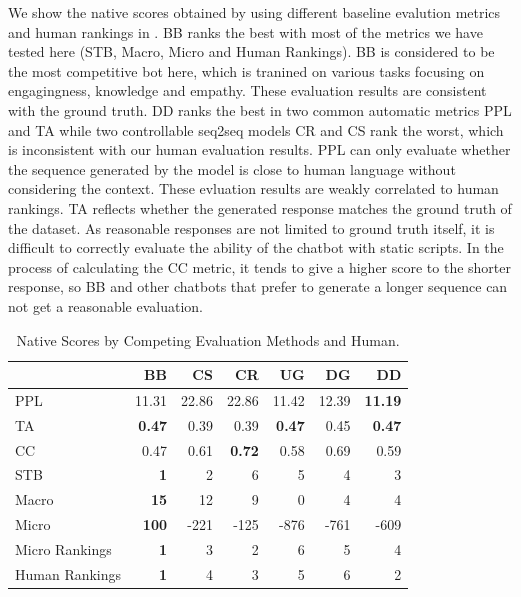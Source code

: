 We show the native scores obtained by using different baseline evalution metrics and human rankings in . BB ranks the best with most of the metrics we have tested here (STB, Macro, Micro and Human Rankings). BB is considered to be the most competitive bot here, which is tranined on various tasks focusing on engagingness, knowledge and empathy. 
These evaluation results are consistent with the ground truth. DD ranks the best in two common automatic metrics PPL and TA while two controllable seq2seq models CR and CS rank the worst, which is inconsistent with our human evaluation results. 
PPL can only evaluate whether the sequence generated by the model is close to human language without considering the context. 
These evluation results are weakly correlated to human rankings. TA reflects whether the generated response matches the ground truth of the dataset. As reasonable responses are not limited to ground truth itself, it is difficult to correctly evaluate the ability of the chatbot with static scripts. In the process of calculating the CC metric, it tends to give a higher score to the shorter response, so BB and other chatbots that prefer to generate a longer sequence can not get a reasonable evaluation.

\begin{table}[ht!]
\centering
\small
\begin{tabular}{lrrrrrr}
\toprule
& BB & CS & CR & UG & DG & DD  \\ \midrule
PPL & 11.31 & 22.86 &22.86 &11.42 & 12.39 & \textbf{11.19}  \\
TA & \textbf{0.47} & 0.39& 0.39 & \textbf{0.47} & 0.45& \textbf{0.47}  \\
CC& 0.47 & 0.61 & \textbf{0.72} &0.58  & 0.69 & 0.59  \\ 
STB & \textbf{1} & 2 & 6& 5 & 4 & 3\\
Macro  &\textbf{15}  &  12&9 & 0& 4& 4\\
Micro & \textbf{100}& -221 & -125 &  -876 & -761 & -609\\ 
Micro Rankings &\textbf{1} &3 &2 &6 &5 &4 \\ \midrule
Human Rankings & \textbf{1} & 4& 3& 5&6 & 2\\
\bottomrule
\end{tabular}
\caption{Native Scores by Competing Evaluation Methods and Human.}
\label{tab:baseline-scoring}
\end{table}



